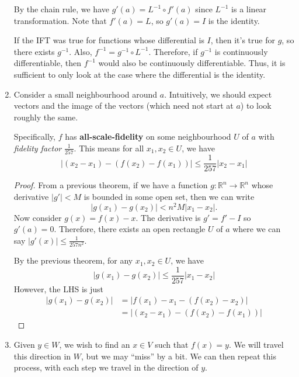 \documentclass{article}
\numberwithin{equation}{section}
\begin{document}
\begin{enumerate}
\begin{center}
          \end{center}
          By the chain rule, we have $g'(a) = L^{-1} \circ f'(a)$ since $L^{-1}$ is a linear transformation. Note that $f'(a) = L$, so $g'(a) = I$ is the identity.

          If the IFT was true for functions whose differential is $I$, then it's true for $g$, so there exists $g^{-1}$. Also, $f^{-1} = g^{-1} \circ L^{-1}.$ Therefore, if $g^{-1}$ is continuously differentiable, then $f^{-1}$ would also be continuously differentiable. Thus, it is sufficient to only look at the case where the differential is the identity.

    \item Consider a small neighbourhood around $a$. Intuitively, we should expect vectors and the image of the vectors (which need not start at $a$) to look roughly the same.

          Specifically, $f$ has \textbf{all-scale-fidelity} on some neighbourhood $U$ of $a$ with \textit{fidelity factor} $\frac{1}{257}.$ This means for all $x_1,x_2 \in U$, we have
          \begin{equation}
              |(x_2-x_1) - (f(x_2)-f(x_1))| \le \frac{1}{257}|x_2-x_1|
          \end{equation}
          \begin{proof}
              From a previous theorem, if we have a function $g:\mathbb{R}^n\rightarrow\mathbb{R}^n$ whose derivative $|g'| < M$ is bounded in some open set, then we can write
              \begin{equation}
                  |g(x_1)-g(x_2)| < n^2M|x_1-x_2|.
              \end{equation}
              Now consider $g(x) = f(x) - x$. The derivative is $g'=f'-I$ so $g'(a)=0.$ Therefore, there exists an open rectangle $U$ of $a$ where we can say $|g'(x)| \le \frac{1}{257n^2}.$

              By the previous theorem, for any $x_1,x_2 \in U$, we have
              \begin{equation}
                  |g(x_1)-g(x_2)| \le \frac{1}{257}|x_1-x_2|
              \end{equation}
              However, the LHS is just
              \begin{align*}
                  |g(x_1)-g(x_2)| & = |f(x_1)-x_1-(f(x_2)-x_2)|   \\
                                  & = |(x_2-x_1)-(f(x_2)-f(x_1))|
              \end{align*}
          \end{proof}
    \item Given $y\in W$, we wish to find an $x \in V$ such that $f(x)=y$. We will travel this direction in $W$, but we may ``miss'' by a bit. We can then repeat this process, with each step we travel in the direction of $y$.


\end{enumerate}
\end{document}
